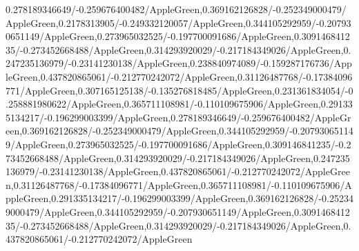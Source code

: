 {\begin{tikzternal}
{0.278189346649/-0.259676400482/AppleGreen,0.369162126828/-0.252349000479/AppleGreen,0.2178313905/-0.249332120057/AppleGreen,0.344105292959/-0.207930651149/AppleGreen,0.273965032525/-0.197700091686/AppleGreen,0.309146841235/-0.273452668488/AppleGreen,0.314293920029/-0.217184349026/AppleGreen,0.247235136979/-0.23141230138/AppleGreen,0.238840974089/-0.159287176736/AppleGreen,0.437820865061/-0.212770242072/AppleGreen,0.31126487768/-0.17384096771/AppleGreen,0.307165125138/-0.135276818485/AppleGreen,0.231361834054/-0.258881980622/AppleGreen,0.365711108981/-0.110109675906/AppleGreen,0.291335134217/-0.196299003399/AppleGreen,0.278189346649/-0.259676400482/AppleGreen,0.369162126828/-0.252349000479/AppleGreen,0.344105292959/-0.207930651149/AppleGreen,0.273965032525/-0.197700091686/AppleGreen,0.309146841235/-0.273452668488/AppleGreen,0.314293920029/-0.217184349026/AppleGreen,0.247235136979/-0.23141230138/AppleGreen,0.437820865061/-0.212770242072/AppleGreen,0.31126487768/-0.17384096771/AppleGreen,0.365711108981/-0.110109675906/AppleGreen,0.291335134217/-0.196299003399/AppleGreen,0.369162126828/-0.252349000479/AppleGreen,0.344105292959/-0.207930651149/AppleGreen,0.309146841235/-0.273452668488/AppleGreen,0.314293920029/-0.217184349026/AppleGreen,0.437820865061/-0.212770242072/AppleGreen} {
 \DATACIRCLE[\c]{(\x,\y)}
}
\end{tikzternal}
}